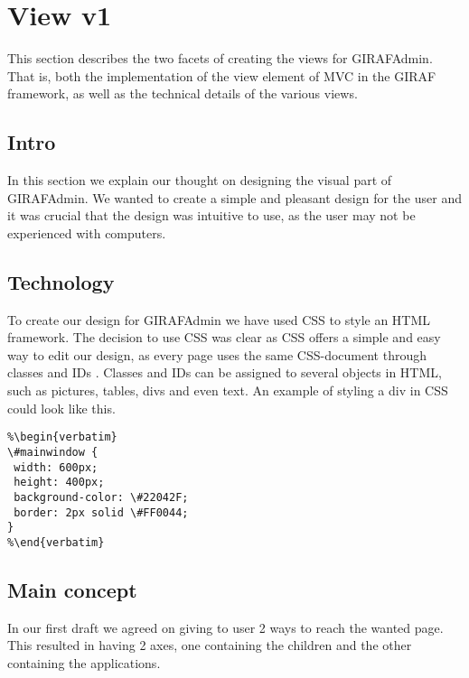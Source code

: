 \section{View v1}
\label{view}
This section describes the two facets of creating the views for GIRAFAdmin. That is, both the implementation of the view element of MVC in the GIRAF framework, as well as the technical details of the various views.

\subsection{Intro}
In this section we explain our thought on designing the visual part of GIRAFAdmin. We wanted to create a simple and pleasant design for the user and it was crucial that the design was intuitive to use, as the user may not be experienced with computers. 


\subsection{Technology}
To create our design for GIRAFAdmin we have used CSS to style an HTML framework. The decision to use CSS was clear as CSS offers a simple and easy way to edit our design, as every page uses the same CSS-document through classes and IDs . Classes and IDs can be assigned to several objects in HTML, such as pictures, tables, divs and even text. An example of styling a div in CSS could look like this. 

\begin{lstlisting}
%\begin{verbatim}
\#mainwindow {	
 width: 600px;
 height: 400px;
 background-color: \#22042F;
 border: 2px solid \#FF0044;
}
%\end{verbatim}
\end{lstlisting}


\subsection{Main concept}
In our first draft we agreed on giving to user 2 ways to reach the wanted page. This resulted in having 2 axes, one containing the children and the other containing the applications. 

